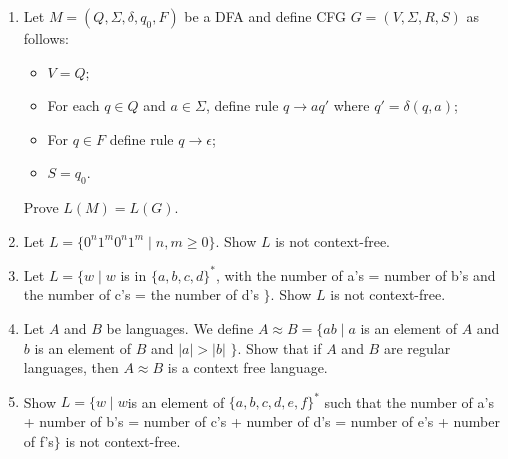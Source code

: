 \documentclass{article}
\begin{document}
\begin{enumerate}
        \item Let $M=(Q,\Sigma, \delta, q_0, F)$ be a DFA and define CFG $G=(V,\Sigma,R,S)$ as follows:
            \begin{itemize}
                \item $V = Q$;
                \item For each $q\in Q$ and $ a\in \Sigma $, define rule $q\rightarrow aq'$ where $q'=\delta(q,a)$;
                \item For $q\in F$ define rule $q\rightarrow\epsilon$;
                \item $S=q_0$.
            \end{itemize}
            Prove $L(M) = L(G)$.

        \item Let $L=\{0^n1^m0^n1^m \mid n,m \geq 0\}$. Show $L$ is not context-free.

        \item Let $L=\{w\mid w $ is in $\{a,b,c,d\}^*$, with the number of a's = number of b's and the number of c's = the number of d's $\}$. Show $L$ is not context-free.

        \item Let $A$ and $B$ be languages. We define $A\approx B = \{ab \mid a $ is an element of $A$ and $b$ is an element of $B$ and $|a| > |b|$ $\}$. Show that if $A$ and $B$ are regular languages, then $A\approx B$ is a context free language.

        \item Show $L = \{w\mid w $is an element of $\{a,b,c,d,e,f\}^*$ such that the number of a's + number of b's = number of c's + number of d's = number of e's + number of f's$ \}$ is not context-free.
    \end{enumerate}
\end{document}
